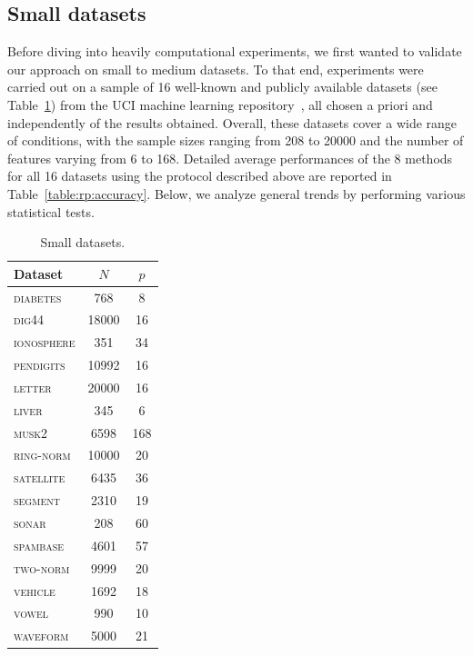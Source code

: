 \subsection{Small datasets}

Before diving into heavily computational experiments, we first wanted to
validate our approach on small to medium datasets. To that end, experiments
were carried out on a sample of 16 well-known and publicly
available datasets (see Table~\ref{table:rp:small-data}) from the UCI machine
learning repository~\citep{frank:2010}, all chosen a priori and
independently of the results obtained. Overall, these datasets cover a wide
range of conditions, with the sample sizes ranging from 208 to 20000 and the
number of features varying from 6 to 168. Detailed average performances of the
8 methods for all 16 datasets using the protocol described above are reported
in Table~\ref{table:rp:accuracy}. Below, we analyze general trends by performing
various statistical tests.

\begin{table}
    \centering
    \footnotesize
    \begin{tabular}{| l | c c |}
    \hline
    \textbf{Dataset} & $N$ & $p$ \\
    \hline
    \hline
        \textsc{diabetes}    & 768       & 8         \\
        \textsc{dig44}       & 18000     & 16        \\
        \textsc{ionosphere}  & 351       & 34        \\
        \textsc{pendigits}   & 10992     & 16        \\
        \textsc{letter}      & 20000     & 16        \\
        \textsc{liver}       & 345       & 6         \\
        \textsc{musk2}       & 6598      & 168       \\
        \textsc{ring-norm}   & 10000     & 20        \\
        \textsc{satellite}   & 6435      & 36        \\
        \textsc{segment}     & 2310      & 19        \\
        \textsc{sonar}       & 208       & 60        \\
        \textsc{spambase}    & 4601      & 57        \\
        \textsc{two-norm}    & 9999      & 20        \\
        \textsc{vehicle}     & 1692      & 18        \\
        \textsc{vowel}       & 990       & 10        \\
        \textsc{waveform}    & 5000      & 21        \\
    \hline
    \end{tabular}
    \caption{Small datasets.}
    \label{table:rp:small-data}
\end{table}

